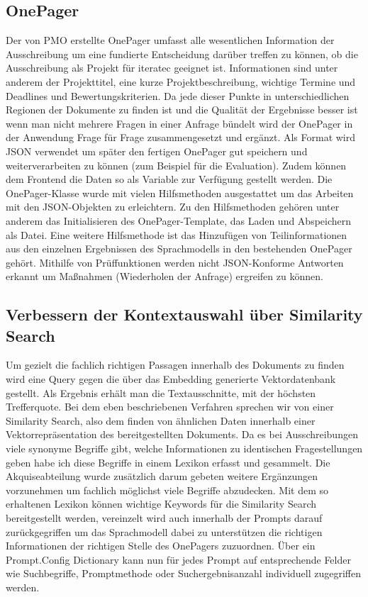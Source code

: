 \subsection{OnePager}
Der von PMO erstellte OnePager umfasst alle wesentlichen Information der Ausschreibung um eine fundierte Entscheidung
darüber treffen zu können, ob die Ausschreibung als Projekt für iteratec geeignet ist. Informationen sind unter anderem
der Projekttitel, eine kurze Projektbeschreibung, wichtige Termine und Deadlines und Bewertungskriterien. Da jede dieser
Punkte in unterschiedlichen Regionen der Dokumente zu finden ist und die Qualität der Ergebnisse besser ist wenn man
nicht mehrere Fragen in einer Anfrage bündelt wird der OnePager in der Anwendung Frage für Frage zusammengesetzt und
ergänzt. Als Format wird JSON verwendet um später den fertigen OnePager gut speichern und weiterverarbeiten zu können
(zum Beispiel für die Evaluation). Zudem können dem Frontend die Daten so als Variable zur Verfügung gestellt werden.
Die OnePager-Klasse wurde mit vielen Hilfsmethoden ausgestattet um das Arbeiten mit den JSON-Objekten zu erleichtern. Zu
den Hilfsmethoden gehören unter anderem das Initialisieren des OnePager-Template, das Laden und Abspeichern als Datei.
Eine weitere Hilfsmethode ist das Hinzufügen von Teilinformationen aus den einzelnen Ergebnissen des Sprachmodells in
den bestehenden OnePager gehört. Mithilfe von Prüffunktionen werden nicht JSON-Konforme Antworten erkannt um
Maßnahmen (Wiederholen der Anfrage) ergreifen zu können.

\subsection{Verbessern der Kontextauswahl über Similarity Search}
\label{chap:Verbessern der Kontextauswahl über Similarity Search}
Um gezielt die fachlich richtigen Passagen innerhalb des Dokuments zu finden wird eine Query gegen die über das
Embedding generierte Vektordatenbank gestellt. Als Ergebnis erhält man die Textausschnitte, mit der höchsten
Trefferquote. Bei dem eben beschriebenen Verfahren sprechen wir von einer Similarity Search, also dem finden von
ähnlichen Daten innerhalb einer Vektorrepräsentation des bereitgestellten Dokuments. Da es bei Ausschreibungen viele
synonyme Begriffe gibt, welche Informationen zu identischen Fragestellungen geben habe ich diese Begriffe in einem
Lexikon erfasst und gesammelt. Die Akquiseabteilung wurde zusätzlich darum gebeten weitere Ergänzungen vorzunehmen um
fachlich möglichst viele Begriffe abzudecken. Mit dem so erhaltenen Lexikon können wichtige Keywords für die Similarity
Search bereitgestellt werden, vereinzelt wird auch innerhalb der Prompts darauf zurückgegriffen um das Sprachmodell
dabei zu unterstützen die richtigen Informationen der richtigen Stelle des OnePagers zuzuordnen. Über ein Prompt.Config
Dictionary kann nun für jedes Prompt auf entsprechende Felder wie Suchbegriffe, Promptmethode oder Suchergebnisanzahl
individuell zugegriffen werden.

